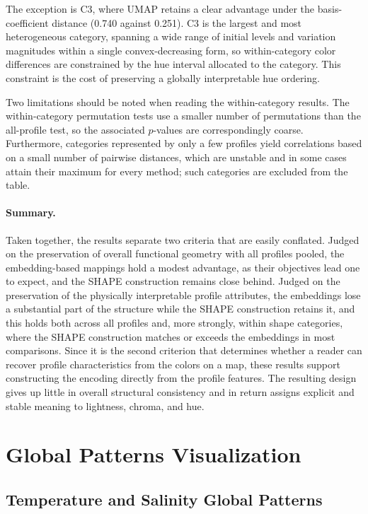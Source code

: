 \documentclass[11pt]{article}
\theoremstyle{plain}
\begin{document}
The exception is C3, where UMAP retains a clear advantage under the
basis-coefficient distance (0.740 against 0.251). C3 is the largest and most
heterogeneous category, spanning a wide range of initial levels and variation
magnitudes within a single convex-decreasing form, so within-category color
differences are constrained by the hue interval allocated to the category. This
constraint is the cost of preserving a globally interpretable hue ordering.

Two limitations should be noted when reading the within-category results. The
within-category permutation tests use a smaller number of permutations than the
all-profile test, so the associated $p$-values are correspondingly coarse.
Furthermore, categories represented by only a few profiles yield correlations
based on a small number of pairwise distances, which are unstable and in some
cases attain their maximum for every method; such categories are excluded from
the table.

\paragraph{Summary.}
Taken together, the results separate two criteria that are easily conflated.
Judged on the preservation of overall functional geometry with all profiles
pooled, the embedding-based mappings hold a modest advantage, as their
objectives lead one to expect, and the SHAPE construction remains close behind.
Judged on the preservation of the physically interpretable profile attributes,
the embeddings lose a substantial part of the structure while the SHAPE
construction retains it, and this holds both across all profiles and, more
strongly, within shape categories, where the SHAPE construction matches or
exceeds the embeddings in most comparisons. Since it is the second criterion
that determines whether a reader can recover profile characteristics from the
colors on a map, these results support constructing the encoding directly from
the profile features. The resulting design gives up little in overall structural
consistency and in return assigns explicit and stable meaning to lightness,
chroma, and hue.



\section{Global Patterns Visualization}
\label{sec:global_vis}

\subsection{Temperature and Salinity Global Patterns}
\end{document}
